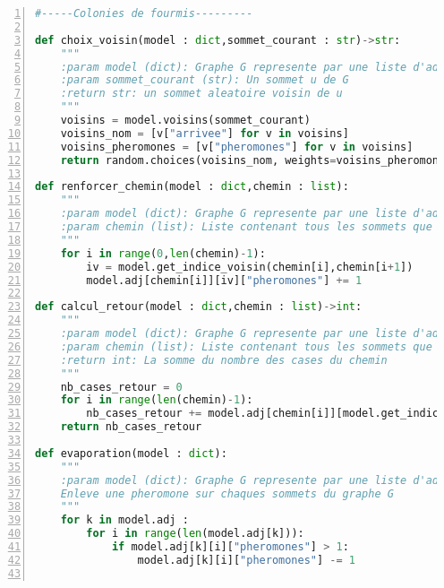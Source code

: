 \documentclass[
12pt,
french,
]{article}
\begin{document}
\begin{lstlisting}[language=Python, numbers=left, label=colonies_fourmis]
#-----Colonies de fourmis---------

def choix_voisin(model : dict,sommet_courant : str)->str:
    """
    :param model (dict): Graphe G represente par une liste d'adjacence
    :param sommet_courant (str): Un sommet u de G
    :return str: un sommet aleatoire voisin de u
    """
    voisins = model.voisins(sommet_courant)
    voisins_nom = [v["arrivee"] for v in voisins]
    voisins_pheromones = [v["pheromones"] for v in voisins]
    return random.choices(voisins_nom, weights=voisins_pheromones, k=len(voisins_pheromones))[0]

def renforcer_chemin(model : dict,chemin : list):
    """
    :param model (dict): Graphe G represente par une liste d'adjacence
    :param chemin (list): Liste contenant tous les sommets que la fourmi a traverse
    """
    for i in range(0,len(chemin)-1):
        iv = model.get_indice_voisin(chemin[i],chemin[i+1])
        model.adj[chemin[i]][iv]["pheromones"] += 1

def calcul_retour(model : dict,chemin : list)->int:
    """
    :param model (dict): Graphe G represente par une liste d'adjacence
    :param chemin (list): Liste contenant tous les sommets que la fourmi a traverse
    :return int: La somme du nombre des cases du chemin
    """
    nb_cases_retour = 0
    for i in range(len(chemin)-1):
        nb_cases_retour += model.adj[chemin[i]][model.get_indice_voisin(chemin[i],chemin[i+1])]["nombre de case"]
    return nb_cases_retour

def evaporation(model : dict):
    """
    :param model (dict): Graphe G represente par une liste d'adjacence
    Enleve une pheromone sur chaques sommets du graphe G
    """
    for k in model.adj :
        for i in range(len(model.adj[k])):
            if model.adj[k][i]["pheromones"] > 1:
                model.adj[k][i]["pheromones"] -= 1


\end{lstlisting}
\end{document}
